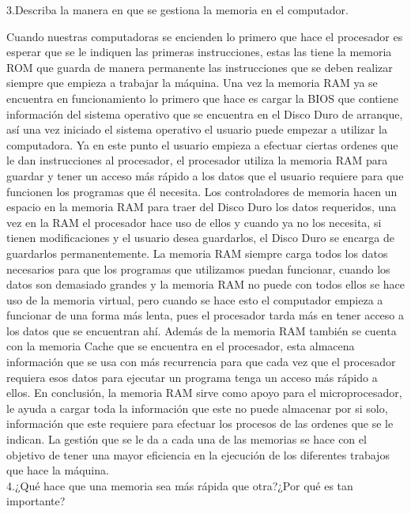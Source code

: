 \documentclass{article}
\begin{document}
3.Describa la manera en que se gestiona la memoria en el computador.

Cuando nuestras computadoras se encienden lo primero que hace el procesador es esperar que se le indiquen las primeras instrucciones, estas las tiene la memoria ROM que guarda de manera permanente las instrucciones que se deben realizar siempre que empieza a trabajar la máquina. Una vez la memoria RAM ya se encuentra en funcionamiento lo primero que hace es cargar la BIOS que contiene información del sistema operativo que se encuentra en el Disco Duro de arranque, así una vez iniciado el sistema operativo el usuario puede empezar a utilizar la computadora. Ya en este punto el usuario empieza a efectuar ciertas ordenes que le dan instrucciones al procesador, el procesador utiliza la memoria RAM para guardar y tener un acceso más rápido a los datos que el usuario requiere para que funcionen los programas que él necesita. Los controladores de memoria hacen un espacio en la memoria RAM para traer del Disco Duro los datos requeridos, una vez en la RAM el procesador hace uso de ellos y cuando ya no los necesita, si tienen modificaciones y el usuario desea guardarlos, el Disco Duro se encarga de guardarlos permanentemente. La memoria RAM siempre carga todos los datos necesarios para que los programas que utilizamos puedan funcionar, cuando los datos son demasiado grandes y la memoria RAM no puede con todos ellos se hace uso de la memoria virtual, pero cuando se hace esto el computador empieza a funcionar de una forma más lenta, pues el procesador tarda más en tener acceso a los datos que se encuentran ahí. Además de la memoria RAM también se cuenta con la memoria Cache que se encuentra en el procesador, esta almacena información que se usa con más recurrencia para que cada vez que el procesador requiera esos datos para ejecutar un programa tenga un acceso más rápido a ellos. En conclusión, la memoria RAM sirve como apoyo para el microprocesador, le ayuda a cargar toda la información que este no puede almacenar por si solo, información que este requiere para efectuar los procesos de las ordenes que se le indican.  La gestión que se le da a cada una de las memorias se hace con el objetivo de tener una mayor eficiencia en la ejecución de los diferentes trabajos que hace la máquina\cite{YouBioit}.\\


4.¿Qué hace que una memoria sea más rápida que otra?¿Por qué es tan importante?
\end{document}
